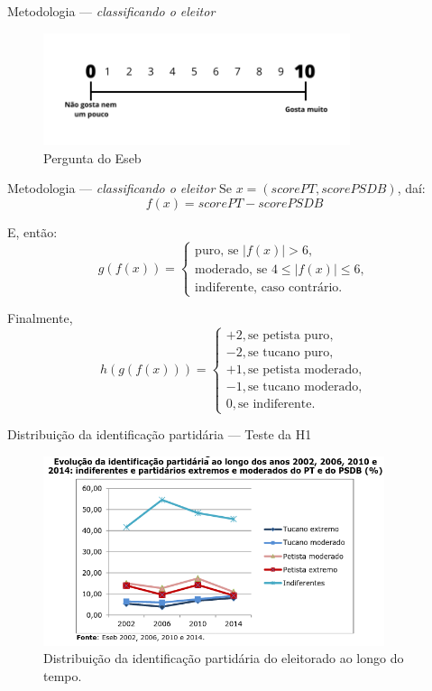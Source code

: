 \documentclass[9pt]{beamer}
\begin{document}
\begin{frame}{Metodologia --- \textit{classificando o eleitor}}
    \begin{figure}[h]
        \includegraphics[width=9cm]{images/escala.png}
        \caption{Pergunta do Eseb}
    \end{figure}

\end{frame}

\begin{frame}{Metodologia --- \textit{classificando o eleitor}}
Se $x = (scorePT, scorePSDB)$, daí:
$$f(x) = scorePT - scorePSDB$$

E, então:
$$g(f(x)) = \begin{cases}
    \text{puro, se } |f(x)| > 6, \\
    \text{moderado, se } 4 \leq |f(x)| \leq 6, \\ 
    \text{indiferente, caso contrário.}
\end{cases}$$

Finalmente, $$h(g(f(x))) = \begin{cases}
    +2, \text{se petista puro}, \\
    -2, \text{se tucano puro}, \\
    +1, \text{se petista moderado}, \\
    -1, \text{se tucano moderado}, \\
    0, \text{se indiferente}.
\end{cases}$$
\end{frame}

\begin{frame}{Distribuição da identificação partidária --- Teste da H1}
    \begin{figure}[h]
        \includegraphics[width=10cm]{images/eleitores.png}
        \caption{Distribuição da identificação partidária do eleitorado ao longo do tempo.}
    \end{figure}
\end{frame}
\end{document}
